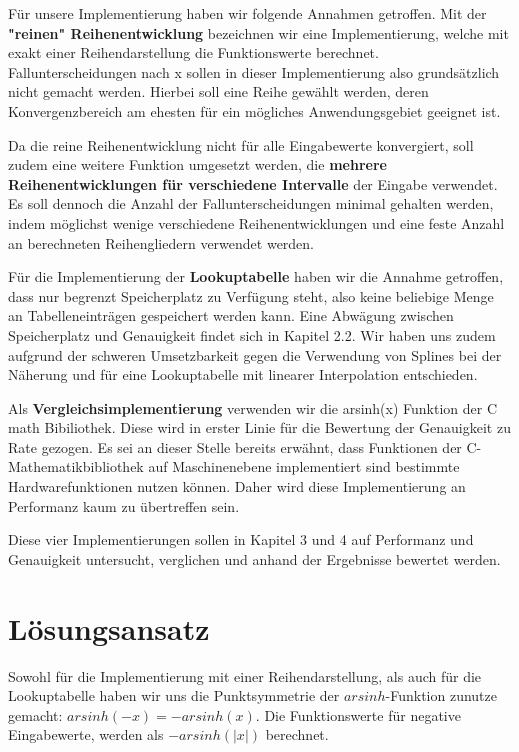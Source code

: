 \documentclass[course=erap] {aspdoc}
\begin{document}
    Für unsere Implementierung haben wir folgende Annahmen getroffen.
    Mit der \textbf{"reinen"  Reihenentwicklung} bezeichnen wir eine Implementierung, welche mit exakt einer Reihendarstellung die Funktionswerte berechnet. Fallunterscheidungen nach x sollen in dieser Implementierung also grundsätzlich nicht gemacht werden. Hierbei soll eine Reihe gewählt werden, deren Konvergenzbereich am ehesten für ein mögliches Anwendungsgebiet geeignet ist.
   
    Da die reine Reihenentwicklung nicht für alle Eingabewerte konvergiert, soll zudem eine weitere Funktion umgesetzt werden, die \textbf{mehrere Reihenentwicklungen für verschiedene Intervalle} der Eingabe verwendet. Es soll dennoch die Anzahl der Fallunterscheidungen minimal gehalten werden, indem  möglichst wenige verschiedene Reihenentwicklungen und eine feste Anzahl an berechneten Reihengliedern verwendet werden.

    Für die Implementierung der \textbf{Lookuptabelle} haben wir die Annahme getroffen, dass nur begrenzt Speicherplatz zu Verfügung steht, also keine beliebige Menge an Tabelleneinträgen gespeichert werden kann. Eine Abwägung zwischen Speicherplatz und Genauigkeit findet sich in Kapitel 2.2. Wir haben uns zudem aufgrund der schweren Umsetzbarkeit gegen die Verwendung von Splines bei der Näherung und für eine Lookuptabelle mit linearer Interpolation entschieden.

    Als \textbf{Vergleichsimplementierung} verwenden wir die arsinh(x) Funktion der C math Bibiliothek. Diese wird in erster Linie für die Bewertung der Genauigkeit zu Rate gezogen. Es sei an dieser Stelle bereits erwähnt, dass Funktionen der C-Mathematikbibliothek auf Maschinenebene implementiert sind bestimmte Hardwarefunktionen nutzen können. Daher wird diese Implementierung an Performanz kaum zu übertreffen sein.

    Diese vier Implementierungen sollen in Kapitel 3 und 4 auf Performanz und Genauigkeit untersucht, verglichen und anhand der Ergebnisse bewertet werden.
    


    \section{Lösungsansatz}

    Sowohl für die Implementierung mit einer Reihendarstellung, als auch für die Lookuptabelle haben wir uns die Punktsymmetrie der $arsinh$-Funktion zunutze gemacht: $arsinh(-x) = -arsinh(x)$. Die Funktionswerte für negative Eingabewerte, werden als $-arsinh(|x|)$ berechnet.
\end{document}
